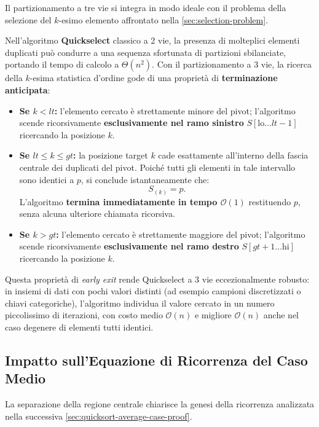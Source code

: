 Il partizionamento a tre vie si integra in modo ideale con il problema della selezione del $k$-esimo elemento affrontato nella \autoref{sec:selection-problem}. 

Nell'algoritmo \textbf{Quickselect} classico a 2 vie, la presenza di molteplici elementi duplicati può condurre a una sequenza sfortunata di partizioni sbilanciate, portando il tempo di calcolo a $\Theta(n^2)$. Con il partizionamento a 3 vie, la ricerca della $k$-esima statistica d'ordine gode di una proprietà di \textbf{terminazione anticipata}:

\begin{itemize}
  \item \textbf{Se $k < lt$:} l'elemento cercato è strettamente minore del pivot; l'algoritmo scende ricorsivamente \textbf{esclusivamente nel ramo sinistro} $S[\text{lo} \dots lt - 1]$ ricercando la posizione $k$.
  \item \textbf{Se $lt \le k \le gt$:} la posizione target $k$ cade esattamente all'interno della fascia centrale dei duplicati del pivot. Poiché tutti gli elementi in tale intervallo sono identici a $p$, si conclude istantaneamente che:
  \begin{equation}
    S_{(k)} = p.
  \end{equation}
  L'algoritmo \textbf{termina immediatamente in tempo $\mathcal{O}(1)$} restituendo $p$, senza alcuna ulteriore chiamata ricorsiva.
  \item \textbf{Se $k > gt$:} l'elemento cercato è strettamente maggiore del pivot; l'algoritmo scende ricorsivamente \textbf{esclusivamente nel ramo destro} $S[gt + 1 \dots \text{hi}]$ ricercando la posizione $k$.
\end{itemize}

Questa proprietà di \textit{early exit} rende Quickselect a 3 vie eccezionalmente robusto: in insiemi di dati con pochi valori distinti (ad esempio campioni discretizzati o chiavi categoriche), l'algoritmo individua il valore cercato in un numero piccolissimo di iterazioni, con costo medio $\mathcal{O}(n)$ e migliore $\mathcal{O}(n)$ anche nel caso degenere di elementi tutti identici.

\subsection{Impatto sull'Equazione di Ricorrenza del Caso Medio}
\label{subsec:3way-average-case-impact}

La separazione della regione centrale chiarisce la genesi della ricorrenza analizzata nella successiva \autoref{sec:quicksort-average-case-proof}. 

